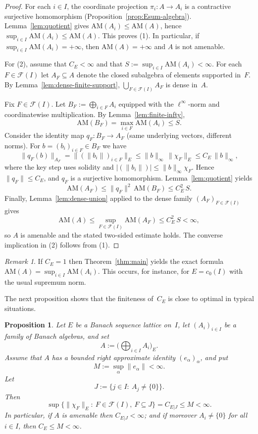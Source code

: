 \documentclass[reqno]{amsart}
\theoremstyle{plain}
\newtheorem{proposition}[theorem]{Proposition}
\theoremstyle{definition}
\theoremstyle{remark}
\newtheorem{remark}[theorem]{Remark}
\newcommand{\AM}{\mathrm{AM}}
\newcommand{\cF}{\mathcal{F}}
\renewcommand{\le}{\leqslant}
\begin{document}
\begin{proof}
For each $i\in I$, the coordinate projection $\pi_i\colon A\to A_i$ is a contractive surjective homomorphism
(Proposition~\ref{prop:Esum-algebra}).  Lemma~\ref{lem:quotient} gives
$\AM(A_i)\le \AM(A)$, hence $\sup_{i\in I}\AM(A_i)\le \AM(A)$.
This proves (1).  In particular, if $\sup_{i\in I}\AM(A_i)=+\infty$, then $\AM(A)=+\infty$ and $A$ is not amenable.

For (2), assume that $C_E<\infty$ and that $S:=\sup_{i\in I}\AM(A_i)<\infty$.
For each $F\in\cF(I)$ let $A_F\subseteq A$ denote the closed subalgebra of elements supported in~$F$.
By Lemma~\ref{lem:dense-finite-support}, $\bigcup_{F\in\cF(I)}A_F$ is dense in~$A$.

Fix $F\in\cF(I)$.
Let $B_F:=\bigoplus_{i\in F} A_i$ equipped with the $\ell^\infty$-norm and coordinatewise multiplication.
By Lemma~\ref{lem:finite-infty},
\[
\AM(B_F)=\max_{i\in F}\AM(A_i)\le S.
\]
Consider the identity map $q_F\colon B_F\to A_F$ (same underlying vectors, different norms).
For $b=(b_i)_{i\in F}\in B_F$ we have
\[
\|q_F(b)\|_{A_F}=\|(\|b_i\|)_{i\in F}\|_E \le \|b\|_\infty\,\|\chi_F\|_E \le C_E\,\|b\|_\infty,
\]
where the key step uses solidity and $|(\|b_i\|)|\le \|b\|_\infty \chi_F$.
Hence $\|q_F\|\le C_E$, and $q_F$ is a surjective homomorphism.
Lemma~\ref{lem:quotient} yields
\[
\AM(A_F)\le \|q_F\|^2\,\AM(B_F)\le C_E^2\,S.
\]
Finally, Lemma~\ref{lem:dense-union} applied to the dense family $(A_F)_{F\in\cF(I)}$ gives
\[
\AM(A)\le \sup_{F\in\cF(I)}\AM(A_F)\le C_E^2\,S<\infty,
\]
so $A$ is amenable and the stated two-sided estimate holds.  The converse implication in (2) follows from (1).
\end{proof}

\begin{remark}\label{rem:CE1}
If $C_E=1$ then Theorem~\ref{thm:main} yields the exact formula
$\AM(A)=\sup_{i\in I}\AM(A_i)$.
This occurs, for instance, for $E=c_0(I)$ with the usual supremum norm.
\end{remark}

The next proposition shows that the finiteness of~$C_E$ is close to optimal in typical situations.

\begin{proposition}\label{prop:CE-necessary}
Let $E$ be a Banach sequence lattice on~$I$, let $(A_i)_{i\in I}$ be a family of Banach algebras, and set
\[
A:=\Big(\bigoplus_{i\in I}A_i\Big)_{\!E}.
\]
Assume that $A$ has a bounded right approximate identity $(e_\alpha)_\alpha$, and put
\[
M:=\sup_\alpha \|e_\alpha\|<\infty.
\]
Let
\[
J:=\{j\in I:\ A_j\neq\{0\}\}.
\]
Then
\[
\sup\bigl\{\|\chi_F\|_E:\ F\in\cF(I),\ F\subseteq J\bigr\}=C_{E|J}\le M<\infty.
\]
In particular, if $A$ is amenable then $C_{E|J}<\infty$; and if moreover
$A_i\neq\{0\}$ for all $i\in I$, then $C_E\le M<\infty$.
\end{proposition}
\end{document}
